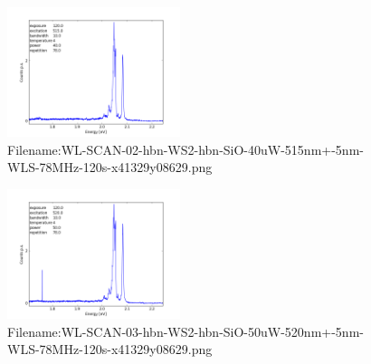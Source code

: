 \documentclass[twocolumn,english]{scrartcl}
\begin{document}
\begin{figure}[H]
\centering
\includegraphics[width=0.45\textwidth]{WL-SCAN-02-hbn-WS2-hbn-SiO-40uW-515nm+-5nm-WLS-78MHz-120s-x41329y08629.png}
\caption{Filename:WL-SCAN-02-hbn-WS2-hbn-SiO-40uW-515nm+-5nm-WLS-78MHz-120s-x41329y08629.png}
\end{figure}
\begin{figure}[H]
\centering
\includegraphics[width=0.45\textwidth]{WL-SCAN-03-hbn-WS2-hbn-SiO-50uW-520nm+-5nm-WLS-78MHz-120s-x41329y08629.png}
\caption{Filename:WL-SCAN-03-hbn-WS2-hbn-SiO-50uW-520nm+-5nm-WLS-78MHz-120s-x41329y08629.png}
\end{figure}
\end{document}
